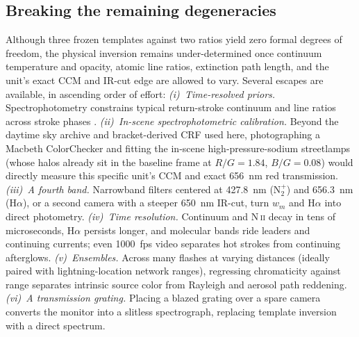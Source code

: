\documentclass[11pt,a4paper]{article}
\newcommand{\Ntp}{N$_2^+$}
\begin{document}
\subsection{Breaking the remaining degeneracies}
\label{sec:degeneracy}
Although three frozen templates against two ratios yield zero formal degrees
of freedom, the physical inversion remains under-determined once continuum
temperature and opacity, atomic line ratios, extinction path length, and the
unit's exact CCM and IR-cut edge are allowed to vary. Several escapes are
available, in ascending order of effort:
\emph{(i)~Time-resolved priors.} Spectrophotometry constrains typical
return-stroke continuum and line ratios across stroke phases
\citep{orville1968,orvillehenderson1984,walker2019}.
\emph{(ii)~In-scene spectrophotometric calibration.} Beyond the daytime sky
archive and bracket-derived CRF used here, photographing a Macbeth
ColorChecker and fitting the in-scene high-pressure-sodium streetlamps (whose
halos already sit in the baseline frame at $R/G=1.84$, $B/G=0.08$) would
directly measure this specific unit's CCM and exact 656~nm red transmission.
\emph{(iii)~A fourth band.} Narrowband filters centered at 427.8~nm (\Ntp{})
and 656.3~nm (H$\alpha$), or a second camera with a steeper 650~nm IR-cut,
turn $w_m$ and H$\alpha$ into direct photometry.
\emph{(iv)~Time resolution.} Continuum and N\,\textsc{ii} decay in tens of
microseconds, H$\alpha$ persists longer, and molecular bands ride leaders and
continuing currents; even 1000~fps video separates hot strokes from continuing
afterglows.
\emph{(v)~Ensembles.} Across many flashes at varying distances (ideally paired
with lightning-location network ranges), regressing chromaticity against range
separates intrinsic source color from Rayleigh and aerosol path reddening.
\emph{(vi)~A transmission grating.} Placing a blazed grating over a spare
camera converts the monitor into a slitless spectrograph, replacing template
inversion with a direct spectrum.
\end{document}
